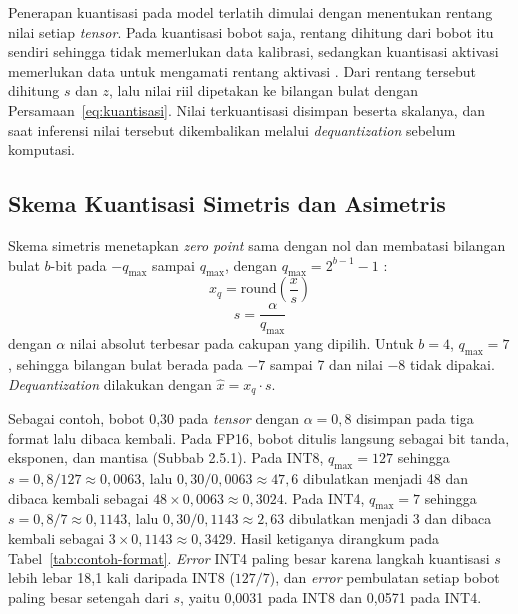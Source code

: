 Penerapan kuantisasi pada model terlatih dimulai dengan menentukan rentang nilai setiap \textit{tensor}. Pada kuantisasi bobot saja, rentang dihitung dari bobot itu sendiri sehingga tidak memerlukan data kalibrasi, sedangkan kuantisasi aktivasi memerlukan data untuk mengamati rentang aktivasi \parencite{gholami2021survey}. Dari rentang tersebut dihitung $s$ dan $z$, lalu nilai riil dipetakan ke bilangan bulat dengan Persamaan~\ref{eq:kuantisasi}. Nilai terkuantisasi disimpan beserta skalanya, dan saat inferensi nilai tersebut dikembalikan melalui \textit{dequantization} sebelum komputasi.

\subsection{Skema Kuantisasi Simetris dan Asimetris}

Skema simetris menetapkan \textit{zero point} sama dengan nol dan membatasi bilangan bulat $b$-bit pada $-q_{\max}$ sampai $q_{\max}$, dengan $q_{\max} = 2^{b-1}-1$ \parencite{gholami2021survey}:
\begin{equation}
  x_q = \mathrm{round}\left(\frac{x}{s}\right)
  \label{eq:simetris}
\end{equation}
\begin{equation}
  s = \frac{\alpha}{q_{\max}}
  \label{eq:skala}
\end{equation}
\noindent dengan $\alpha$ nilai absolut terbesar pada cakupan yang dipilih. Untuk $b = 4$, $q_{\max} = 7$, sehingga bilangan bulat berada pada $-7$ sampai 7 dan nilai $-8$ tidak dipakai. \textit{Dequantization} dilakukan dengan $\hat{x} = x_q \cdot s$.

Sebagai contoh, bobot 0,30 pada \textit{tensor} dengan $\alpha = 0{,}8$ disimpan pada tiga format lalu dibaca kembali. Pada FP16, bobot ditulis langsung sebagai bit tanda, eksponen, dan mantisa (Subbab 2.5.1). Pada INT8, $q_{\max} = 127$ sehingga $s = 0{,}8/127 \approx 0{,}0063$, lalu $0{,}30/0{,}0063 \approx 47{,}6$ dibulatkan menjadi 48 dan dibaca kembali sebagai $48 \times 0{,}0063 \approx 0{,}3024$. Pada INT4, $q_{\max} = 7$ sehingga $s = 0{,}8/7 \approx 0{,}1143$, lalu $0{,}30/0{,}1143 \approx 2{,}63$ dibulatkan menjadi 3 dan dibaca kembali sebagai $3 \times 0{,}1143 \approx 0{,}3429$. Hasil ketiganya dirangkum pada Tabel~\ref{tab:contoh-format}. \textit{Error} INT4 paling besar karena langkah kuantisasi $s$ lebih lebar 18,1 kali daripada INT8 ($127/7$), dan \textit{error} pembulatan setiap bobot paling besar setengah dari $s$, yaitu 0,0031 pada INT8 dan 0,0571 pada INT4.

